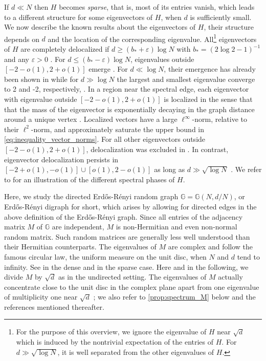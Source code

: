 \documentclass[11pt]{article}
\newcommand{\eps}{\varepsilon}
\theoremstyle{plain}
\theoremstyle{remark}
\numberwithin{equation}{section}
\newcommand{\nc}{\normalcolor}
\begin{document}
If $d \ll N$ then $H$ becomes \emph{sparse}, that is, most of its entries vanish, 
which leads to a different structure for some eigenvectors of $H$, when $d$ is sufficiently small. 
We now describe the known results about the eigenvectors of $H$, their structure depends on $d$ and the location of the corresponding eigenvalue. 
\nc 	
	All\footnote{For the purpose of this overview, we ignore the eigenvalue of $H$ near $\sqrt{d}$ which is induced by the nontrivial expectation of the entries of $H$. For $d \gg \sqrt{\log N}$, it is well separated from the other eigenvalues of $H$.} eigenvectors of $H$ are completely delocalized if $d \geq (b_* + \eps) \log N$ 
	with $b_* = (2 \log 2 -1)^{-1}$ and any $\eps>0$ \cite{MR2964770,MR3098073,MR4021251,alt2021delocalization,ADK_deloc_everywhere}.  
	For $d \leq (b_* - \eps) \log N$, eigenvalues outside $[-2-o(1), 2 + o(1)]$ emerge  \cite{ADK_outliers,MR4234995}. For $d \ll \log N$, their emergence has already been shown in \cite{MR3945756} while for $d \gg \log N$ the largest and smallest 
	eigenvalue converge to 2 and -2, respectively, \cite{MR2964770,BBK_spec_radii}. 
	In a region near the spectral edge, each eigenvector with eigenvalue outside $[-2-o(1), 2 + o(1)]$ is localized in the sense that that the mass of the eigenvector is exponentially decaying in the graph distance around a unique vertex \cite{alt2023poisson,ADK_localized}. 
 	Localized vectors have a large $\ell^\infty$-norm, relative to their $\ell^2$-norm, and approximately saturate the upper bound 
in \cref{eq:inequality_vector_norms}. 
	For all other eigenvectors outside $[-2-o(1), 2 +o(1)]$, delocalization was excluded in \cite{alt2021delocalization}. 
 In contrast, eigenvector delocalization persists in $[-2 + o(1), -o(1)]\cup [o(1), 2 - o(1)]$
 as long as $d \gg \sqrt{\log N}$ \cite{alt2021delocalization}. 
 We refer to \cite[Figure~1.1]{ADK_localized} for an illustration of the different spectral phases of $H$. 

Here, we study the directed Erd{\H o}s-R\'enyi random graph $\mathbb{G}=\mathbb{G}(N,d/N)$, or Erd{\H o}s-R\'enyi digraph for short, which arises by allowing for directed edges in the above definition of the Erd{\H o}s-R\'enyi graph.  
Since all entries of the adjacency matrix $M$ of $\mathbb{G}$ are independent,  
 $M$ is non-Hermitian and even non-normal random matrix. Such random matrices are generally less well understood than their Hermitian counterparts. 
 The eigenvalues of $M$ are complex and follow the famous circular law, the uniform measure on the unit disc, when $N$ and $d$ tend to infinity. See \cite{girko1985circular,bai1997,MR2663633,MR2575411,MR2722794,MR2735731} in the dense and  \cite{MR2977992,BasakRudelson2019,RudelsonTikhomirov2019} in the sparse case.  
 Here and in the following, we divide $M$ by $\sqrt{d}$ as in the undirected setting. 
The eigenvalues of $M$ actually concentrate close to the unit disc in the complex plane apart from one eigenvalue of multiplicity one near $\sqrt{d}$ \cite{MR4206685,MR4649432}; we also refer to \cref{prop:spectrum_M} below and the references mentioned thereafter. 
\end{document}
